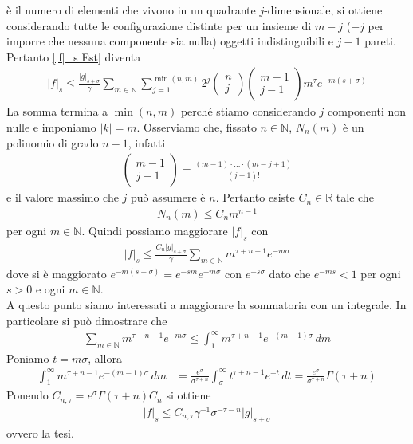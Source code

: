\documentclass[twoside, 11pt]{amsbook}
\makeatletter
\newcommand{\0}{{(0)}}
\newcommand{\3}{{(3)}}
\theoremstyle{colonplain}
\theoremstyle{colondefinition}
\theoremstyle{colonremark}
\numberwithin{equation}{chapter}
\renewcommand{\proofname}{Dimostrazione}
\renewenvironment{proof}[1][\proofname]{\par
  \pushQED{\qed}%
  \normalfont \topsep6\p@\@plus6\p@\relax
  \trivlist
  \item[\hskip\labelsep\bfseries #1:]\ignorespaces
}{%
  \popQED\endtrivlist\@endpefalse
}
\makeatother
\begin{document}
\begin{proof}
è il numero di elementi che vivono in un quadrante $j$-dimensionale, si ottiene considerando tutte le configurazione distinte per un insieme di $m - j$ ($-j$ per imporre che nessuna componente sia nulla) oggetti indistinguibili e $j - 1$ pareti. Pertanto \eqref{|f|_s Est} diventa
\begin{align}
    |f|_s \leq \frac{|g|_{s + \sigma}}{\gamma} \sum_{m \in \mathbb{N}}\sum_{j = 1}^{\min(n, m)} 2^j\begin{pmatrix}
        n \\
        j
    \end{pmatrix} \begin{pmatrix}
        m - 1 \\
        j - 1
    \end{pmatrix} m^\tau e^{-m(s + \sigma)}
\end{align}
La somma termina a $\min(n, m)$ perché stiamo considerando $j$ componenti non nulle e imponiamo $|k| = m$. Osserviamo che, fissato $n \in \mathbb{N}$, $N_n(m)$ è un polinomio di grado $n - 1$, infatti
\begin{align}
    \begin{pmatrix}
        m - 1 \\
        j - 1
    \end{pmatrix} = \frac{(m - 1)\cdot \dots \cdot(m - j + 1)}{(j - 1)!}
\end{align}
e il valore massimo che $j$ può assumere è $n$. Pertanto esiste $C_n \in \mathbb{R}$ tale che
\begin{align}
    N_n(m) \leq C_n m^{n - 1}
\end{align}
per ogni $m \in \mathbb{N}$. Quindi possiamo maggiorare $|f|_s$ con
\begin{align}
    |f|_s \leq \frac{C_n |g|_{s + \sigma}}{\gamma}\sum_{m \in \mathbb{N}} m^{\tau + n - 1}e^{-m\sigma}
\end{align}
dove si è maggiorato $e^{-m(s + \sigma)} = e^{-sm}e^{-m\sigma}$ con $e^{-s\sigma}$ dato che $e^{-ms} < 1$ per ogni $s > 0$ e ogni $m \in \mathbb{N}$. \\
A questo punto siamo interessati a maggiorare la sommatoria con un integrale. In particolare si può dimostrare che
\begin{align}
    \sum_{m \in \mathbb{N}} m^{\tau + n - 1}e^{-m\sigma} \leq \int_1^\infty m^{\tau + n - 1}e^{-(m - 1)\sigma} \, dm
\end{align}
Poniamo $t = m\sigma$, allora
\begin{align}
    \int_1^\infty m^{\tau + n - 1}e^{-(m - 1)\sigma} \, dm &= \frac{e^\sigma}{\sigma^{\tau + n}}\int_\sigma^\infty t^{\tau + n - 1}e^{-t} \, dt = \frac{e^\sigma}{\sigma^{\tau + n}}\Gamma(\tau + n)
\end{align}
Ponendo $C_{n, \tau} = e^\sigma\Gamma(\tau + n)C_n$ si ottiene
\begin{align}
    |f|_s \leq C_{n, \tau}\gamma^{-1}\sigma^{-\tau - n}|g|_{s + \sigma}
\end{align}
ovvero la tesi.
\end{proof}
\end{document}
